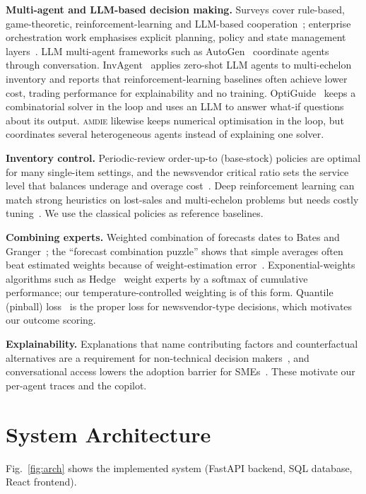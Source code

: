 \documentclass[conference]{IEEEtran}
\newcommand{\amdie}{\textsc{amdie}}
\begin{document}
\textbf{Multi-agent and LLM-based decision making.} Surveys cover rule-based, game-theoretic, reinforcement-learning and LLM-based cooperation~\cite{jin2025}; enterprise orchestration work emphasises explicit planning, policy and state management layers~\cite{adimulam2026}. LLM multi-agent frameworks such as AutoGen~\cite{wu2023autogen} coordinate agents through conversation. InvAgent~\cite{quan2025invagent} applies zero-shot LLM agents to multi-echelon inventory and reports that reinforcement-learning baselines often achieve lower cost, trading performance for explainability and no training. OptiGuide~\cite{li2023optiguide} keeps a combinatorial solver in the loop and uses an LLM to answer what-if questions about its output. \amdie{} likewise keeps numerical optimisation in the loop, but coordinates several heterogeneous agents instead of explaining one solver.

\textbf{Inventory control.} Periodic-review order-up-to (base-stock) policies are optimal for many single-item settings, and the newsvendor critical ratio sets the service level that balances underage and overage cost~\cite{zipkin2000}. Deep reinforcement learning can match strong heuristics on lost-sales and multi-echelon problems but needs costly tuning~\cite{gijsbrechts2022,boute2022}. We use the classical policies as reference baselines.

\textbf{Combining experts.} Weighted combination of forecasts dates to Bates and Granger~\cite{bates1969}; the ``forecast combination puzzle'' shows that simple averages often beat estimated weights because of weight-estimation error~\cite{smith2009}. Exponential-weights algorithms such as Hedge~\cite{freund1997} weight experts by a softmax of cumulative performance; our temperature-controlled weighting is of this form. Quantile (pinball) loss~\cite{koenker1978} is the proper loss for newsvendor-type decisions, which motivates our outcome scoring.

\textbf{Explainability.} Explanations that name contributing factors and counterfactual alternatives are a requirement for non-technical decision makers~\cite{mersha2024,dandl2020}, and conversational access lowers the adoption barrier for SMEs~\cite{radhakrishnan2025}. These motivate our per-agent traces and the copilot.

\section{System Architecture}
Fig.~\ref{fig:arch} shows the implemented system (FastAPI backend, SQL database, React frontend).
\end{document}
